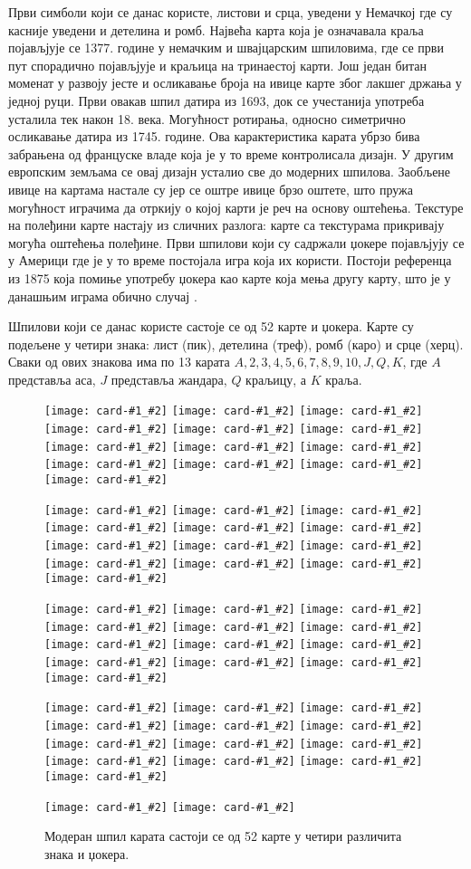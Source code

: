 \documentclass[a4paper, 12pt, ngerman]{article}
\newcommand{\cardsm}[2]{\texttt{[image: card-\#1\_\#2]}}
\begin{document}
Први симболи који се данас користе, листови и срца, уведени у Немачкој где су касније уведени и детелина и ромб. Највећа карта која је означавала краља појављјује се 1377. године у немачким и швајцарским шпиловима, где се први пут спорадично појављјује и краљица на тринаестој карти. Још један битан моменат у развоју јесте и осликавање броја на ивице карте због лакшег држања у једној руци. Први овакав шпил датира из 1693, док се учестанија употреба усталила тек након 18. века. Могућност ротирања, односно симетрично осликавање датира из 1745. године. Ова карактеристика карата убрзо бива забрањена од француске владе која је у то време контролисала дизајн. У другим европским земљама се овај дизајн усталио све до модерних шпилова. Заобљене ивице на картама настале су јер се оштре ивице брзо оштете, што пружа могућност играчима да отркију о којој карти је реч на основу оштећења. Текстуре на полеђини карте настају из сличних разлога: карте са текстурама прикривају могућа оштећења полеђине. Први шпилови који су садржали џокере појављјују се у Америци где је у то време постојала игра која их користи. Постоји референца из 1875 која помиње употребу џокера као карте која мења другу карту, што је у данашњим играма обично случај \cite{wopc}.

Шпилови који се данас користе састоје се од 52 карте и џокера. Карте су подељене у четири знака: лист (пик), детелина (треф), ромб (каро) и срце (херц). Сваки од ових знакова има по 13 карата $A, 2, 3, 4, 5, 6, 7, 8, 9, 10, J, Q, K$, где $A$ представља аса, $J$ представља жандара, $Q$ краљицу, а $K$ краља.

\begin{figure}[htbp]
	\centering
	\cardsm{1}{spade}
	\cardsm{2}{spade}
	\cardsm{3}{spade}
	\cardsm{4}{spade}
	\cardsm{5}{spade}
	\cardsm{6}{spade}
	\cardsm{7}{spade}
	\cardsm{8}{spade}
	\cardsm{9}{spade}
	\cardsm{10}{spade}
	\cardsm{jack}{spade}
	\cardsm{queen}{spade}
	\cardsm{king}{spade}
	
	\cardsm{1}{heart}
	\cardsm{2}{heart}
	\cardsm{3}{heart}
	\cardsm{4}{heart}
	\cardsm{5}{heart}
	\cardsm{6}{heart}
	\cardsm{7}{heart}
	\cardsm{8}{heart}
	\cardsm{9}{heart}
	\cardsm{10}{heart}
	\cardsm{jack}{heart}
	\cardsm{queen}{heart}
	\cardsm{king}{heart}
	
	\cardsm{1}{club}
	\cardsm{2}{club}
	\cardsm{3}{club}
	\cardsm{4}{club}
	\cardsm{5}{club}
	\cardsm{6}{club}
	\cardsm{7}{club}
	\cardsm{8}{club}
	\cardsm{9}{club}
	\cardsm{10}{club}
	\cardsm{jack}{club}
	\cardsm{queen}{club}
	\cardsm{king}{club}
	
	\cardsm{1}{diamond}
	\cardsm{2}{diamond}
	\cardsm{3}{diamond}
	\cardsm{4}{diamond}
	\cardsm{5}{diamond}
	\cardsm{6}{diamond}
	\cardsm{7}{diamond}
	\cardsm{8}{diamond}
	\cardsm{9}{diamond}
	\cardsm{10}{diamond}
	\cardsm{jack}{diamond}
	\cardsm{queen}{diamond}
	\cardsm{king}{diamond}
	
	\cardsm{black}{joker}
	\cardsm{red}{joker}
	\caption{Модеран шпил карата састоји се од 52 карте у четири различита знака и џокера.}
\end{figure}
\end{document}
